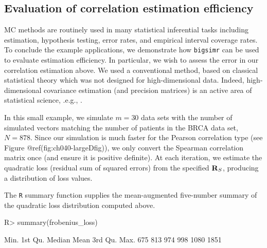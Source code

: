 \documentclass[
]{jss}
\begin{document}
\hypertarget{evaluation-of-correlation-estimation-efficiency}{%
\subsection{Evaluation of correlation estimation
efficiency}\label{evaluation-of-correlation-estimation-efficiency}}

MC methods are routinely used in many statistical inferential tasks
including estimation, hypothesis testing, error rates, and empirical
interval coverage rates. To conclude the example applications, we
demonstrate how \texttt{bigsimr} can be used to evaluate estimation
efficiency. In particular, we wish to assess the error in our
correlation estimation above. We used a conventional method, based on
classical statistical theory which was not designed for high-dimensional
data. Indeed, high-dimensional covariance estimation (and precision
matrices) is an active area of statistical science, .e.g.,
\citep{Won2013g, VanWieringen2016}.

In this small example, we simulate \(m=30\) data sets with the number of
simulated vectors matching the number of patients in the BRCA data set,
\(N=878\). Since our simulation is much faster for the Pearson
correlation type (see Figure @ref(fig:ch040-largeDfig)), we only convert
the Spearman correlation matrix once (and ensure it is positive
definite). At each iteration, we estimate the quadratic loss (residual
sum of squared errors) from the specified \({\bf R}_{S}\), producing a
distribution of loss values.

\begin{CodeChunk}
\end{CodeChunk}

The \texttt{R} summary function supplies the mean-augmented five-number
summary of the quadratic loss distribution computed above.

\begin{CodeChunk}
\begin{CodeInput}
R> summary(frobenius_loss)
\end{CodeInput}
\begin{CodeOutput}
   Min. 1st Qu.  Median    Mean 3rd Qu.    Max. 
    675     813     974     998    1080    1851 
\end{CodeOutput}
\end{CodeChunk}
\end{document}
